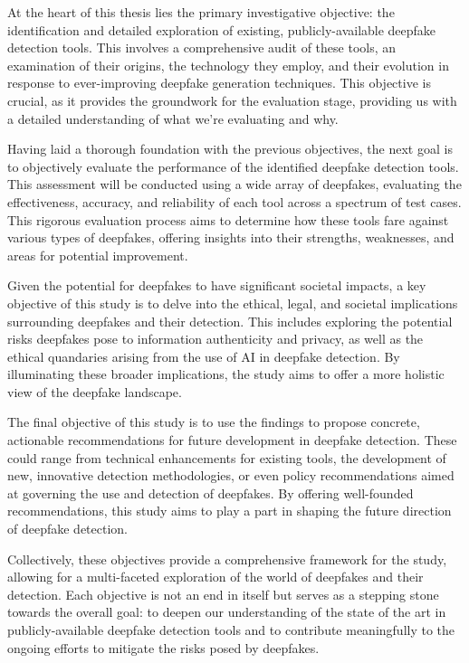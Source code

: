 At the heart of this thesis lies the primary investigative objective: the identification 
and detailed exploration of existing, publicly-available deepfake detection tools. 
This involves a comprehensive audit of these tools, an examination of their origins, 
the technology they employ, and their evolution in response to ever-improving deepfake 
generation techniques. This objective is crucial, as it provides the groundwork for 
the evaluation stage, providing us with a detailed understanding of what we're 
evaluating and why.

Having laid a thorough foundation with the previous objectives, the next goal is to objectively 
evaluate the performance of the identified deepfake detection tools. This assessment 
will be conducted using a wide array of deepfakes, evaluating the effectiveness, 
accuracy, and reliability of each tool across a spectrum of test cases. This rigorous 
evaluation process aims to determine how these tools fare against various types of 
deepfakes, offering insights into their strengths, weaknesses, and areas for potential 
improvement.

Given the potential for deepfakes to have significant societal impacts, a key objective of this 
study is to delve into the ethical, legal, and societal implications surrounding deepfakes 
and their detection. This includes exploring the potential risks deepfakes pose to 
information authenticity and privacy, as well as the ethical quandaries arising from 
the use of AI in deepfake detection. By illuminating these broader implications, the 
study aims to offer a more holistic view of the deepfake landscape.

The final objective of this study is to use the findings to propose concrete, actionable 
recommendations for future development in deepfake detection. These could range from 
technical enhancements for existing tools, the development of new, innovative detection 
methodologies, or even policy recommendations aimed at governing the use and detection 
of deepfakes. By offering well-founded recommendations, this study aims to play a part 
in shaping the future direction of deepfake detection.

Collectively, these objectives provide a comprehensive framework for the study, allowing 
for a multi-faceted exploration of the world of deepfakes and their detection. Each 
objective is not an end in itself but serves as a stepping stone towards the overall 
goal: to deepen our understanding of the state of the art in publicly-available deepfake 
detection tools and to contribute meaningfully to the ongoing efforts to mitigate the 
risks posed by deepfakes.

